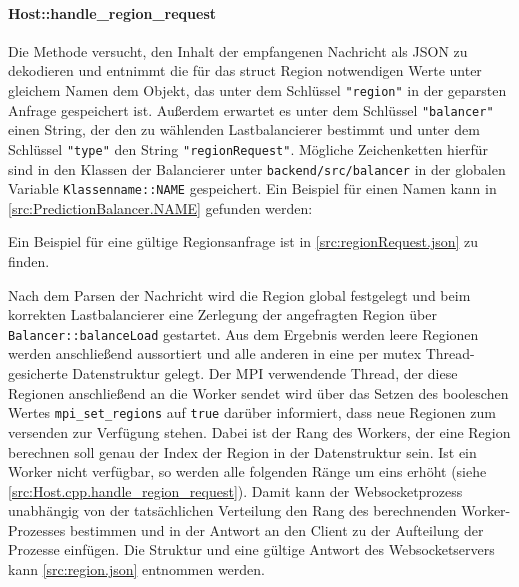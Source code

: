 \begin{figure}
	
\end{figure}

\paragraph{Host::handle\_region\_request}\label{cls:Host::handle_region_request}

Die Methode versucht, den Inhalt der empfangenen Nachricht als JSON zu dekodieren und entnimmt die für das struct Region
notwendigen Werte unter gleichem Namen dem Objekt, das unter dem Schlüssel \verb|"region"| in der geparsten Anfrage gespeichert ist.
Außerdem erwartet es unter dem Schlüssel \verb|"balancer"| einen String, der den zu wählenden Lastbalancierer bestimmt und unter dem Schlüssel \verb|"type"| den String \verb|"regionRequest"|.
Mögliche Zeichenketten hierfür sind in den Klassen der Balancierer unter \verb|backend/src/balancer| in der globalen Variable
\verb|Klassenname::NAME| gespeichert.
Ein Beispiel für einen Namen kann in \autoref{src:PredictionBalancer.NAME} gefunden werden:

\begin{figure}[h]
	
\end{figure}

Ein Beispiel für eine gültige Regionsanfrage ist in \autoref{src:regionRequest.json} zu finden.

\begin{figure}
	
\end{figure}

Nach dem Parsen der Nachricht wird die Region global festgelegt und beim korrekten Lastbalancierer eine Zerlegung der angefragten Region über \verb|Balancer::balanceLoad| gestartet.
Aus dem Ergebnis werden leere Regionen werden anschließend aussortiert und alle anderen in eine per mutex Thread-gesicherte Datenstruktur
gelegt. Der MPI verwendende Thread, der diese Regionen anschließend an die Worker sendet wird über das Setzen des booleschen Wertes \verb|mpi_set_regions|
auf \verb|true| darüber informiert, dass neue Regionen zum versenden zur Verfügung stehen.
Dabei ist der Rang des Workers, der eine Region berechnen soll genau der Index der Region in der Datenstruktur sein.
Ist ein Worker nicht verfügbar, so werden alle folgenden Ränge um eins erhöht (siehe \autoref{src:Host.cpp.handle_region_request}).
Damit kann der Websocketprozess unabhängig von der tatsächlichen Verteilung den Rang des berechnenden Worker-Prozesses
bestimmen und in der Antwort an den Client zu der Aufteilung der Prozesse einfügen.
Die Struktur und eine gültige Antwort des Websocketservers kann \autoref{src:region.json} entnommen werden.

